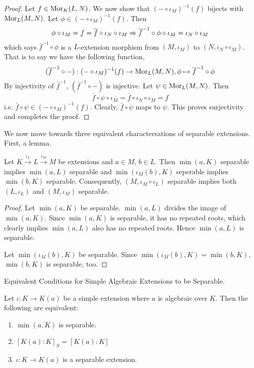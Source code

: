 \documentclass[../book.tex]{subfiles}
\begin{document}
\begin{proof}
    Let $f \in \text{Mor}_{K}(L, N)$. 
    We now show that $(- \circ \iota_M)^{-1}(f)$ bijects with $\text{Mor}_{L}(M, N)$.
    Let $\phi \in (- \circ \iota_M)^{-1}(f)$.
    Then \[
        \phi\circ\iota_M = f = \overline{f}\circ\iota_N\circ\iota_M 
        \Rightarrow \overline{f}^{-1}\circ\phi\circ\iota_M = \iota_N\circ\iota_M 
    \]
    which says $\bar{f}^{-1}\circ\phi$ is a $L$-extension morphism
    from $(M,\iota_M)$ to $(N,\iota_N\circ\iota_M)$.
    That is to say we have the following function, \[
        (\overline{f}^{-1} \circ -) : (- \circ \iota_M)^{-1}(f) \to \text{Mor}_{L}(M, N),
        \phi \mapsto \overline{f}^{-1}\circ\phi
    \]
    By injectivity of $\bar{f}^{-1}$, $(\bar{f}^{-1} \circ -)$ is injective.
    Let $\psi \in \text{Mor}_{L}(M, N)$. Then \[
        \bar{f}\circ\psi\circ\iota_M = \bar{f}\circ\iota_N\circ\iota_M = f
    \]
    i.e. $\bar{f}\circ\psi \in (- \circ \iota_M)^{-1}(f)$.
    Clearly, $\bar{f}\circ\psi$ maps to $\psi$.
    This proves surjectivity and completes the proof. 
\end{proof}
We now move towards three equivalent charactersations of separable extensions. 
First, a lemma. 
\begin{lem} 
    
    Let $K \overset{\iota_L}{\to} L \overset{\iota_M}{\to} M$ be extensions
    and $a \in M$, $b \in L$. 
    Then $\min(a,K)$ separable implies $\min(a,L)$ separable
    and $\min(\iota_M(b),K)$ seperable implies $\min(b,K)$ separable.
    Consequently, $(M,\iota_M\circ\iota_L)$ separable implies
    both $(L,\iota_L)$ and $(M,\iota_M)$ separable. 
\end{lem}
\begin{proof}
    Let $\min(a,K)$ be separable.
    $\min(a,L)$ divides the image of $\min(a,K)$. 
    Since $\min(a,K)$ is separable, it has no repeated roots,
    which clearly implies $\min(a,L)$ also has no repeated roots. 
    Hence $\min(a,L)$ is separable. 
    
    Let $\min(\iota_M(b),K)$ be separable. 
    Since $\min(\iota_M(b),K) = \min(b,K)$, $\min(b,K)$ is separable, too. 
\end{proof}
\begin{thm} Equivalent Conditions for Simple Algebraic 
Extensions to be Separable.

    Let $\iota : K \to K(a)$ be a simple extension where 
    $a$ is algebraic over $K$.
    Then the following are equivalent: 
    \begin{enumerate}
        \item $\min(a,K)$ is separable.
        \item $[K(a) : K]_S = [K(a) : K]$
        \item $\iota : K \to K(a)$ is a separable extension. 
    \end{enumerate}
\end{thm}
\end{document}
